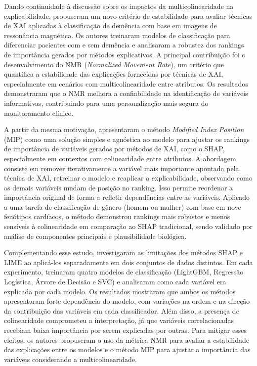 Dando continuidade à discussão sobre os impactos da multicolinearidade na explicabilidade,  propuseram um novo critério de estabilidade para avaliar técnicas de XAI aplicadas à classificação de demência com base em imagens de ressonância magnética. Os autores treinaram modelos de classificação para diferenciar pacientes com e sem demência e analisaram a robustez dos rankings de importância gerados por métodos explicativos. A principal contribuição foi o desenvolvimento do NMR (\textit{Normalized Movement Rate}), um critério que quantifica a estabilidade das explicações fornecidas por técnicas de XAI, especialmente em cenários com multicolinearidade entre atributos. Os resultados demonstraram que o NMR melhora a confiabilidade na identificação de variáveis informativas, contribuindo para uma personalização mais segura do monitoramento clínico.

A partir da mesma motivação,  apresentaram o método \textit{Modified Index Position} (MIP) como uma solução simples e agnóstica ao modelo para ajustar os rankings de importância de variáveis gerados por métodos de XAI, como o SHAP, especialmente em contextos com colinearidade entre atributos. A abordagem consiste em remover iterativamente a variável mais importante apontada pela técnica de XAI, retreinar o modelo e reaplicar a explicabilidade, observando como as demais variáveis mudam de posição no ranking. Isso permite reordenar a importância original de forma a refletir dependências entre as variáveis. Aplicado a uma tarefa de classificação de gênero (homem ou mulher) com base em nove fenótipos cardíacos, o método demonstrou rankings mais robustos e menos sensíveis à colinearidade em comparação ao SHAP tradicional, sendo validado por análise de componentes principais e plausibilidade biológica.

Complementando esse estudo,  investigaram as limitações dos métodos SHAP e LIME ao aplicá-los separadamente em dois conjuntos de dados distintos. Em cada experimento, treinaram quatro modelos de classificação (LightGBM, Regressão Logística, Árvore de Decisão e SVC) e analisaram como cada variável era explicada por cada modelo. Os resultados mostraram que ambos os métodos apresentaram forte dependência do modelo, com variações na ordem e na direção da contribuição das variáveis em cada classificador. Além disso, a presença de colinearidade comprometeu a interpretação, já que variáveis correlacionadas recebiam baixa importância por serem explicadas por outras. Para mitigar esses efeitos, os autores propuseram o uso da métrica NMR para avaliar a estabilidade das explicações entre os modelos e o método MIP para ajustar a importância das variáveis considerando a multicolinearidade. 

